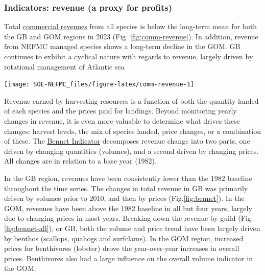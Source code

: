 \documentclass[
  10pt,
]{article}
\let\origfigure\figure
\let\endorigfigure\endfigure
\renewenvironment{figure}[1][2] {
    \expandafter\origfigure\expandafter[H]
} {
    \endorigfigure
}
\begin{document}
\hypertarget{indicators-revenue-a-proxy-for-profits}{%
\subsubsection{Indicators: revenue (a proxy for profits)}\label{indicators-revenue-a-proxy-for-profits}}

Total \href{https://noaa-edab.github.io/catalog/comdat.html}{commercial revenues} from all species is below the long-term mean for both the GB and GOM regions in 2023 (Fig. \ref{fig:comm-revenue}). In addition, revenue from NEFMC managed species shows a long-term decline in the GOM. GB continues to exhibit a cyclical nature with regards to revenue, largely driven by rotational management of Atlantic sea

\begin{figure}

{\centering \texttt{[image: SOE-NEFMC\_files/figure-latex/comm-revenue-1]} 

}

\caption{Revenue through 2023 for the New England region: total (black) and from NEFMC managed species (red).}\label{fig:comm-revenue}
\end{figure}

Revenue earned by harvesting resources is a function of both the quantity landed of each species and the prices paid for landings. Beyond monitoring yearly changes in revenue, it is even more valuable to determine what drives these changes: harvest levels, the mix of species landed, price changes, or a combination of these. The \href{https://noaa-edab.github.io/catalog/bennet.html}{Bennet Indicator} decomposes revenue change into two parts, one driven by changing quantities (volumes), and a second driven by changing prices. All changes are in relation to a base year (1982).

In the GB region, revenues have been consistently lower than the 1982 baseline throughout the time series. The changes in total revenue in GB was primarily driven by volumes prior to 2010, and then by prices (Fig.\ref{fig:bennet}). In the GOM, revenues have been above the 1982 baseline in all but four years, largely due to changing prices in most years. Breaking down the revenue by guild (Fig. \ref{fig:bennet-all}), or GB, both the volume and price trend have been largely driven by benthos (scallops, quahogs and surfclams). In the GOM region, increased prices for benthivores (lobster) drove the year-over-year increases in overall prices. Benthivores also had a large influence on the overall volume indicator in the GOM.
\end{document}
